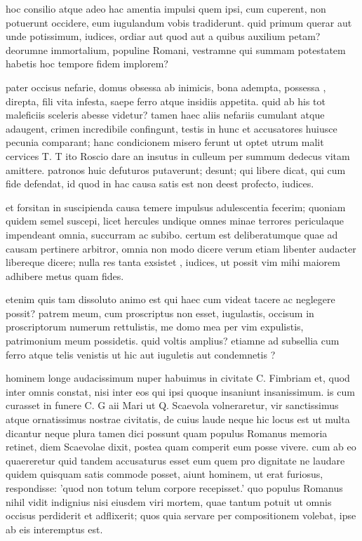 hoc consilio atque adeo hac amentia impulsi quem ipsi, cum cuperent, non potuerunt occidere, eum iugulandum vobis tradiderunt. quid primum querar aut unde potissimum, iudices, ordiar aut quod aut a quibus auxilium petam? deorumne immortalium, populine Romani, vestramne qui summam potestatem habetis hoc tempore fidem implorem?

 pater occisus nefarie, domus obsessa ab inimicis, bona adempta, possessa , direpta, fili vita infesta, saepe ferro atque insidiis appetita. quid ab his tot maleficiis sceleris abesse videtur? tamen haec aliis nefariis cumulant atque adaugent, crimen incredibile confingunt, testis in hunc et accusatores huiusce pecunia comparant; hanc condicionem misero ferunt ut optet utrum malit cervices T. T ito Roscio dare an insutus in culleum per summum dedecus vitam amittere. patronos huic defuturos putaverunt; desunt; qui libere dicat, qui cum fide defendat, id quod in hac causa satis est non deest profecto, iudices.

 et forsitan in suscipienda causa temere impulsus adulescentia fecerim; quoniam quidem semel suscepi, licet hercules undique omnes minae terrores periculaque impendeant omnia, succurram ac subibo. certum est deliberatumque quae ad causam pertinere arbitror, omnia non modo dicere verum etiam libenter audacter libereque dicere; nulla res tanta exsistet , iudices, ut possit vim mihi maiorem adhibere metus quam fides.

 etenim quis tam dissoluto animo est qui haec cum videat tacere ac neglegere possit? patrem meum, cum proscriptus non esset, iugulastis, occisum in proscriptorum numerum rettulistis, me domo mea per vim expulistis, patrimonium meum possidetis. quid voltis amplius? etiamne ad subsellia cum ferro atque telis venistis ut hic aut iuguletis aut condemnetis ?

 hominem longe audacissimum nuper habuimus in civitate C. Fimbriam et, quod inter omnis constat, nisi inter eos qui ipsi quoque insaniunt insanissimum. is cum curasset in funere C. G aii Mari ut Q. Scaevola volneraretur, vir sanctissimus atque ornatissimus nostrae civitatis, de cuius laude neque hic locus est ut multa dicantur neque plura tamen dici possunt quam populus Romanus memoria retinet, diem Scaevolae dixit, postea quam comperit eum posse vivere. cum ab eo quaereretur quid tandem accusaturus esset eum quem pro dignitate ne laudare quidem quisquam satis commode posset, aiunt hominem, ut erat furiosus, respondisse: 'quod non totum telum corpore recepisset.' quo populus Romanus nihil vidit indignius nisi eiusdem viri mortem, quae tantum potuit ut omnis occisus perdiderit et adflixerit; quos quia servare per compositionem volebat, ipse ab eis interemptus est.

